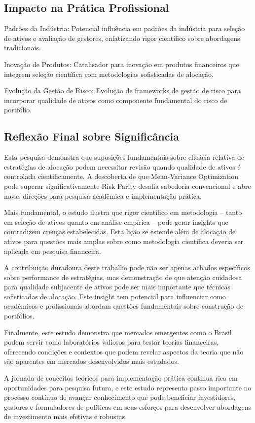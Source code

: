 \subsection{Impacto na Prática Profissional}

Padrões da Indústria: Potencial influência em padrões da indústria para seleção de ativos e avaliação de gestores, enfatizando rigor científico sobre abordagens tradicionais.

Inovação de Produtos: Catalisador para inovação em produtos financeiros que integrem seleção científica com metodologias sofisticadas de alocação.

Evolução da Gestão de Risco: Evolução de frameworks de gestão de risco para incorporar qualidade de ativos como componente fundamental do risco de portfólio.

\subsection{Reflexão Final sobre Significância}

Esta pesquisa demonstra que suposições fundamentais sobre eficácia relativa de estratégias de alocação podem necessitar revisão quando qualidade de ativos é controlada cientificamente. A descoberta de que Mean-Variance Optimization pode superar significativamente Risk Parity desafia sabedoria convencional e abre novas direções para pesquisa acadêmica e implementação prática.

Mais fundamental, o estudo ilustra que rigor científico em metodologia – tanto em seleção de ativos quanto em análise empírica – pode gerar insights que contradizem crenças estabelecidas. Esta lição se estende além de alocação de ativos para questões mais amplas sobre como metodologia científica deveria ser aplicada em pesquisa financeira.

A contribuição duradoura deste trabalho pode não ser apenas achados específicos sobre performance de estratégias, mas demonstração de que atenção cuidadosa para qualidade subjacente de ativos pode ser mais importante que técnicas sofisticadas de alocação. Este insight tem potencial para influenciar como acadêmicos e profissionais abordam questões fundamentais sobre construção de portfólios.

Finalmente, este estudo demonstra que mercados emergentes como o Brasil podem servir como laboratórios valiosos para testar teorias financeiras, oferecendo condições e contextos que podem revelar aspectos da teoria que não são aparentes em mercados desenvolvidos mais estudados.

A jornada de conceitos teóricos para implementação prática continua rica em oportunidades para pesquisa futura, e este estudo representa passo importante no processo contínuo de avançar conhecimento que pode beneficiar investidores, gestores e formuladores de políticas em seus esforços para desenvolver abordagens de investimento mais efetivas e robustas.
